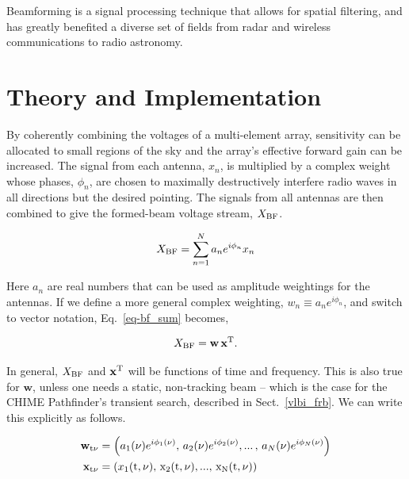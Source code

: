Beamforming is a signal processing technique that allows for 
spatial filtering, and has greatly benefited a diverse set of fields 
from radar and wireless communications to radio astronomy.

  
  
\section{Theory and Implementation}
\label{sec:theory}

By coherently combining the voltages of a multi-element array, 
sensitivity can be allocated to small regions of the sky and 
the array's effective forward gain can be increased. The signal 
from each antenna, $x_n$, is multiplied by a complex weight whose 
phases, $\phi_{n}$, are chosen to maximally destructively interfere radio waves 
in all directions but the desired pointing. The signals 
from all antennas are then combined to give the formed-beam 
voltage stream, $X_{\rm BF}$.

\begin{equation}
\label{eq-bf_sum}
X_{\rm BF} = \sum_{{n}=1}^N a_n e^{i\phi_{n}} x_n
\end{equation}

\noindent Here $a_n$ are real numbers that can be used as 
amplitude weightings for the antennas. If we define a more 
general complex weighting, $w_n \equiv a_n e^{i\phi_{n}}$, and 
switch to vector notation, Eq.~\ref{eq-bf_sum} becomes,

\begin{equation}
X_{\rm BF} = \mathbf{w} \, \mathbf{x}^{\rm T} .
\end{equation}

\noindent In general, $X_{\rm BF}$ and $\mathbf{x}^{\rm T}$ will be 
functions of time and frequency. This is also true for $\mathbf{w}$,
unless one needs a static, non-tracking beam -- which is the case for the 
CHIME Pathfinder's transient search, described in
Sect.~\ref{vlbi_frb}. We can write this explicitly as follows. 


\begin{align}
     \mathbf{w}_{\rm t \nu} &= \left (a_1(\nu) e^{i \phi_1(\nu)}, \, 
     a_2(\nu) e^{i \phi_2(\nu)}, ... \,, \,a_N(\nu) e^{i \phi_N(\nu)} \right )\\
     \mathbf{x}_{\rm t \nu} &= \left ( x_1(\rm{t}, \nu), \, x_2(\rm{t}, \nu), 
     ..., \, x_N(\rm{t}, \nu) \right )
\end{align}

